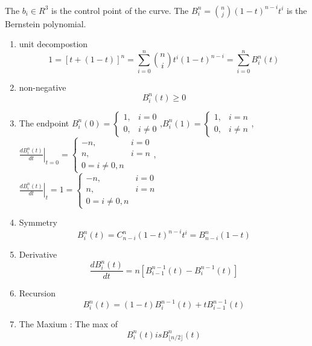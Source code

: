 \begin{remark}
	The $b_i\in R_{}^{3}$ is the control point of the curve. The $B_{i}^{n}=\binom{n}{j}(1-t)_{}^{n-i}t^i$ is the Bernstein polynomial.
\end{remark}
\newpage
\begin{property}
	\begin{enumerate}
		\item unit decompostion \begin{equation*}
			      1 = \left[t+(1-t)\right]^n = \sum\limits_{i=0}^{n}\binom{n}{i}t^i(1-t)^{n-i} = \sum\limits_{i=0}^{n}B_i^n(t)
		      \end{equation*}
		\item non-negative \begin{equation*}
			      B_i^n(t)\geq 0
		      \end{equation*}
		\item The endpoint $B_{i}^{n}(0) = \begin{cases}
				      1 , & i = 0    \\
				      0 , & i \neq 0
			      \end{cases}$,\quad$B_{i}^{n}(1)=\begin{cases}
				      1 , & i = n    \\
				      0 , & i \neq n
			      \end{cases}$,$\left. \frac{dB_i^n(t)}{dt}\right|_{t=0}=\begin{cases}
				      -n , & i = 0 \\
				      n ,  & i = n \\
				      0 = i \neq 0,n
			      \end{cases}$,\\$\left. \frac{d B_{i}^{n}(t)}{dt}\right|_t=1 = \begin{cases}
			      -n , & i = 0 \\
			      n ,  & i = n \\
			      0 = i \neq 0,n
		      \end{cases}$
		\item Symmetry \begin{equation*}
			      B_{i}^{n}(t) = C_{n-i}^{n}(1-t)^{n-i}t^{i} = B_{n-i}^{n}(1-t)
		      \end{equation*}
		\item Derivative \begin{equation*}
			      \frac{d B_{i}^{n}(t)}{dt} = n\left[B_{i-1}^{n-1}(t)-B_{i}^{n-1}(t)\right]
		      \end{equation*}
		\item Recursion \begin{equation*}
			      B_{i}^{n}(t) = (1-t)B_{i}^{n-1}(t)+tB_{i-1}^{n-1}(t)
		      \end{equation*}
		\item The Maxium : The max of \begin{equation*}
			      B_{i}^{n}(t) is B_{\lfloor n/2 \rfloor}^{n}(t)
		      \end{equation*}


\end{enumerate}
\end{property}
